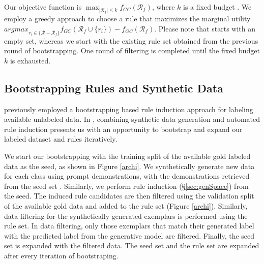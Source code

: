 Our objective function is $\max_{|\mathcal{R}_{f}|\leq k} f_{GC}(\mathcal{R}_{f})$, where $k$ is a fixed budget \cite{kothawade2021prism}. We employ a greedy approach to choose a rule that maximizes the marginal utility 
$\textit{argmax}_{r_{i}\in\{\mathcal{R}-\mathcal{R}_{f}\}} f_{GC}(\mathcal{R}_{f}\cup \{r_i\})-f_{GC}(\mathcal{R}_{f})$. %
Please note that \citet{bajpai-etal-2024-fair} starts with an empty set, whereas we start with the existing rule set obtained from the previous round of bootstrapping. One round of filtering is completed until the fixed budget $k$ is exhausted. 



\subsection{Bootstrapping Rules and Synthetic Data}

%

\citet{varma2018snuba} previously employed a bootstrapping based rule induction approach for labeling available unlabeled data. In \our, combining synthetic data generation and automated rule induction presents us with an opportunity to bootstrap and expand our labeled dataset and rules iteratively.



We start our bootstrapping with the training split of the available gold labeled data as the seed, as shown in Figure \ref{archi}. We synthetically generate new data for each class using prompt demonstrations, with the demonstrations retrieved from the seed set \cite{zhang-etal-2022-active, peng2024revisiting}. Similarly, we perform rule induction (\S \ref{sec:genSpace}) from the seed. The induced rule candidates are then filtered using the validation split of the available gold data and added to the rule set (Figure \ref{archi}). Similarly, data filtering for the synthetically generated exemplars is performed using the rule set. In data filtering, only those exemplars that match their generated label with the predicted label from the generative model are filtered. Finally, the seed set is expanded with the filtered data. The seed set and the rule set are expanded after every iteration of bootstraping.

